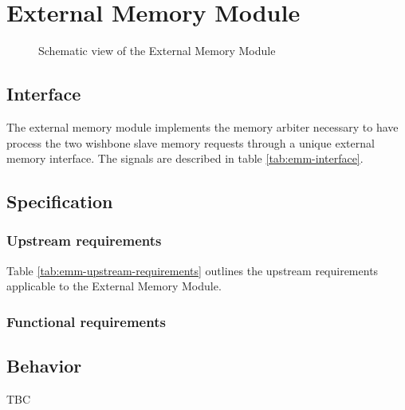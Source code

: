 \section{External Memory Module}
\begin{figure}[h!]
    \centering
    
    \caption{Schematic view of the External Memory Module}
    \label{fig:emm}
\end{figure}

\subsection{Interface}

\begin{content}
The external memory module implements the memory arbiter necessary to have process the two wishbone slave memory requests through a unique external memory interface. The signals are described in table \ref{tab:emm-interface}. 
\end{content}



\subsection{Specification}

\subsubsection{Upstream requirements}

Table \ref{tab:emm-upstream-requirements} outlines the upstream requirements applicable to the External Memory Module.



\subsubsection{Functional requirements}

\subsection{Behavior}

\begin{content}
    TBC
\end{content}

\newpage